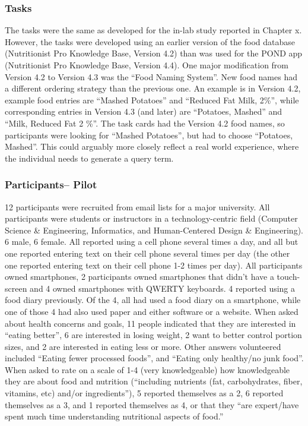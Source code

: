 \subsubsection{Tasks}
The tasks were the same as developed for the in-lab study reported in Chapter x. However, the tasks were developed using an earlier version of the food database (Nutritionist Pro Knowledge Base, Version 4.2) than was used for the POND app (Nutritionist Pro Knowledge Base, Version 4.4). One major modification from Version 4.2 to Version 4.3 was the ``Food Naming System''. New food names had a different ordering strategy than the previous one. An example is in Version 4.2, example food entries are ``Mashed Potatoes'' and ``Reduced Fat Milk, 2\%'', while corresponding entries in Version 4.3 (and later) are ``Potatoes, Mashed'' and ``Milk, Reduced Fat 2 \%''. The task cards had the Version 4.2 food names, so participants were looking for ``Mashed Potatoes'', but had to choose ``Potatoes, Mashed''. This could arguably more closely reflect a real world experience, where the individual needs to generate a query term.

\subsubsection{Participants-- Pilot}

12 participants were recruited from email lists for a major university. All participants were students or instructors in a technology-centric field (Computer Science \& Engineering, Informatics,  and Human-Centered Design \& Engineering). 6 male, 6 female.  All reported using a cell phone several times a day, and all but one reported entering text on their cell phone several times per day (the other one reported entering text on their cell phone 1-2 times per day). All participants owned smartphones, 2 participants owned smartphones that didn't have a touch-screen and 4 owned smartphones with QWERTY keyboards. 4 reported using a food diary previously. Of the 4, all had used a food diary on a smartphone, while one of those 4 had also used paper and either software or a website. When asked about health concerns and goals, 11 people indicated that they are interested in ``eating better'', 6 are interested in losing weight, 2 want to better control portion sizes, and 2 are interested in eating less or more. Other answers volunteered included ``Eating fewer processed foods'', and ``Eating only healthy/no junk food''. When asked to rate on a scale of 1-4 (very knowledgeable) how knowledgeable they are about food and nutrition (``including nutrients (fat, carbohydrates, fiber, vitamins, etc) and/or ingredients''), 5 reported themselves as a 2, 6 reported themselves as a 3, and 1 reported themselves as 4, or that they ``are expert/have spent much time understanding nutritional aspects of food.''

